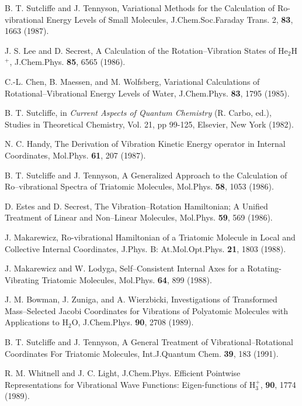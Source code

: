 \begin{thebibliography}{999}
B. T. Sutcliffe and J. Tennyson, 
Variational Methods for the Calculation of Ro-vibrational Energy
Levels of Small Molecules,
J.Chem.Soc.Faraday Trans. 2, 
{\bf 83}, 1663 (1987).


J. S. Lee and D. Secrest, 
A Calculation of the Rotation--Vibration States of He$_2$H$^+$,
J.Chem.Phys. {\bf 85}, 6565 (1986).

C.-L. Chen, B. Maessen, and M. Wolfsberg, 
Variational Calculations of Rotational--Vibrational Energy
Levels of Water,
J.Chem.Phys. {\bf 83}, 1795 
(1985).

B. T. Sutcliffe, in {\em Current Aspects of Quantum Chemistry}
(R. Carbo, ed.), Studies in Theoretical Chemistry, Vol. 21,
pp 99-125, Elsevier, New York (1982).

N. C. Handy, 
The Derivation of Vibration Kinetic Energy
operator in Internal Coordinates,
Mol.Phys. {\bf 61}, 207 (1987).

B. T. Sutcliffe and J. Tennyson, 
A Generalized Approach to the Calculation of Ro--vibrational Spectra
of Triatomic Molecules,
Mol.Phys. {\bf 58}, 1053 (1986).

D. Estes and D. Secrest, 
The Vibration--Rotation Hamiltonian; A Unified
Treatment of Linear and Non--Linear Molecules,
Mol.Phys. {\bf 59}, 569 (1986).

J. Makarewicz, 
Ro-vibrational Hamiltonian of a Triatomic Molecule in 
Local and Collective Internal Coordinates,
J.Phys. B: At.Mol.Opt.Phys. {\bf 21}, 1803 (1988).

J. Makarewicz and W. Lodyga, 
Self--Consistent Internal Axes for a Rotating-Vibrating
Triatomic Molecules,
Mol.Phys. {\bf 64}, 899 (1988).

J. M. Bowman, J. Zuniga, and A. Wierzbicki, 
Investigations of Transformed Mass--Selected Jacobi Coordinates
for Vibrations of Polyatomic Molecules with Applications to H$_2$O,
J.Chem.Phys. {\bf 90}, 2708 (1989).

B. T. Sutcliffe and J. Tennyson, 
A General Treatment of Vibrational--Rotational Coordinates
For Triatomic Molecules,
Int.J.Quantum Chem. {\bf 39},
183 (1991).

R. M. Whitnell and J. C. Light, J.Chem.Phys. 
Efficient Pointwise Representations for
Vibrational Wave Functions: Eigen-functions of H$_3^+$,
{\bf 90}, 1774 (1989).


\end{thebibliography}
